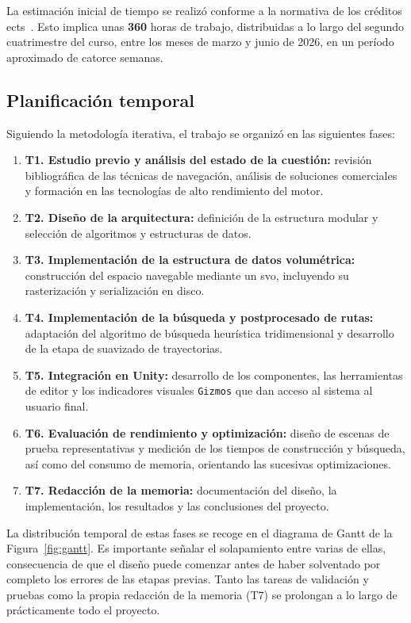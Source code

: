La estimación inicial de tiempo se realizó conforme a la normativa de los créditos \acrfull{ects}~\cite{rd_ects_2003}.
Esto implica unas \textbf{360} horas de trabajo, distribuidas a lo largo del segundo cuatrimestre del curso, entre los meses de marzo y junio de 2026, en un período aproximado de catorce semanas.

\subsection{Planificación temporal}

Siguiendo la metodología iterativa, el trabajo se organizó en las siguientes fases:

\begin{enumerate}
    \item \textbf{T1. Estudio previo y análisis del estado de la cuestión:} revisión bibliográfica de las técnicas de navegación, análisis de soluciones comerciales y formación en las tecnologías de alto rendimiento del motor.
    \item \textbf{T2. Diseño de la arquitectura:} definición de la estructura modular y selección de algoritmos y estructuras de datos.
    \item \textbf{T3. Implementación de la estructura de datos volumétrica:} construcción del espacio navegable mediante un \acrshort{svo}, incluyendo su rasterización y serialización en disco.
    \item \textbf{T4. Implementación de la búsqueda y postprocesado de rutas:} adaptación del algoritmo de búsqueda heurística tridimensional y desarrollo de la etapa de suavizado de trayectorias.
    \item \textbf{T5. Integración en Unity:} desarrollo de los componentes, las herramientas de editor y los indicadores visuales \texttt{Gizmos} que dan acceso al sistema al usuario final.
    \item \textbf{T6. Evaluación de rendimiento y optimización:} diseño de escenas de prueba representativas y medición de los tiempos de construcción y búsqueda, así como del consumo de memoria, orientando las sucesivas optimizaciones.
    \item \textbf{T7. Redacción de la memoria:} documentación del diseño, la implementación, los resultados y las conclusiones del proyecto.
\end{enumerate}

La distribución temporal de estas fases se recoge en el diagrama de Gantt de la Figura~\ref{fig:gantt}.
Es importante señalar el solapamiento entre varias de ellas, consecuencia de que el diseño puede comenzar antes de haber solventado por completo los errores de las etapas previas.
Tanto las tareas de validación y pruebas como la propia redacción de la memoria (T7) se prolongan a lo largo de prácticamente todo el proyecto.

